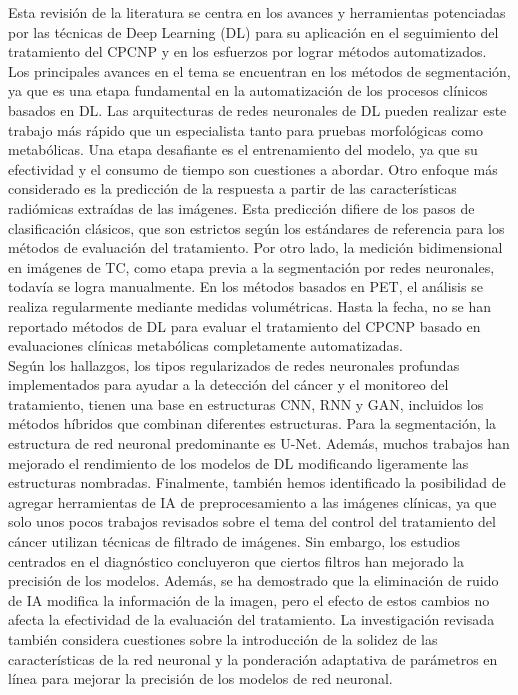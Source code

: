 \documentclass[11pt,a4paper,openany]{article}
\begin{document}
    Esta revisión de la literatura se centra en los avances y herramientas potenciadas por las técnicas de Deep Learning (DL) para su aplicación en el seguimiento del tratamiento del CPCNP y en los esfuerzos por lograr métodos automatizados. Los principales avances en el tema se encuentran en los métodos de segmentación, ya que es una etapa fundamental en la automatización de los procesos clínicos basados en DL. Las arquitecturas de redes neuronales de DL pueden realizar este trabajo más rápido que un especialista tanto para pruebas morfológicas como metabólicas. Una etapa desafiante es el entrenamiento del modelo, ya que su efectividad y el consumo de tiempo son cuestiones a abordar. Otro enfoque más considerado es la predicción de la respuesta a partir de las características radiómicas extraídas de las imágenes. Esta predicción difiere de los pasos de clasificación clásicos, que son estrictos según los estándares de referencia para los métodos de evaluación del tratamiento. Por otro lado, la medición bidimensional en imágenes de TC, como etapa previa a la segmentación por redes neuronales, todavía se logra manualmente. En los métodos basados en PET, el análisis se realiza regularmente mediante medidas volumétricas. Hasta la fecha, no se han reportado métodos de DL para evaluar el tratamiento del CPCNP basado en evaluaciones clínicas metabólicas completamente automatizadas.\\

    Según los hallazgos, los tipos regularizados de redes neuronales profundas implementados para ayudar a la detección del cáncer y el monitoreo del tratamiento, tienen una base en estructuras CNN, RNN y GAN, incluidos los métodos híbridos que combinan diferentes estructuras. Para la segmentación, la estructura de red neuronal predominante es U-Net. Además, muchos trabajos han mejorado el rendimiento de los modelos de DL modificando ligeramente las estructuras nombradas. Finalmente, también hemos identificado la posibilidad de agregar herramientas de IA de preprocesamiento a las imágenes clínicas, ya que solo unos pocos trabajos revisados sobre el tema del control del tratamiento del cáncer utilizan técnicas de filtrado de imágenes. Sin embargo, los estudios centrados en el diagnóstico concluyeron que ciertos filtros han mejorado la precisión de los modelos. Además, se ha demostrado que la eliminación de ruido de IA modifica la información de la imagen, pero el efecto de estos cambios no afecta la efectividad de la evaluación del tratamiento. La investigación revisada también considera cuestiones sobre la introducción de la solidez de las características de la red neuronal y la ponderación adaptativa de parámetros en línea para mejorar la precisión de los modelos de red neuronal.
        
\end{document}
